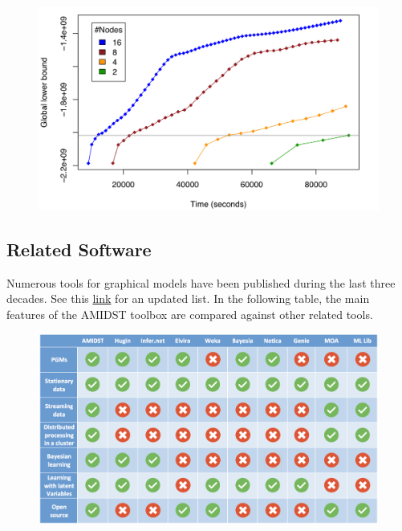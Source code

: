 \documentclass[10pt,a4paper]{article}
\begin{document}
\begin{figure}[h!]
	\centering
	\includegraphics[width=15cm]{img/cluster_res.png}
\end{figure}


	\subsection{Related Software}
	
	

Numerous tools for graphical models have been published during the last three decades. See this \href{http://www.cs.ubc.ca/~murphyk/Software/bnsoft.html}{link} for an updated list. In the following table, the main features of the AMIDST toolbox are compared against other related tools.




\begin{figure}[h!]
	\centering
	\includegraphics[width=15cm]{img/related_tools.png}
\end{figure}
\end{document}
